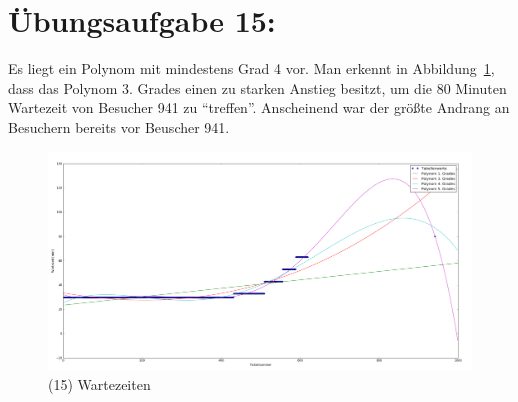 

	\section*{Übungsaufgabe 15:}

	Es liegt ein Polynom mit mindestens Grad 4 vor. Man erkennt in Abbildung~\ref{fig:wartezeiten}, dass das Polynom 3. Grades einen zu starken Anstieg
	besitzt, um die 80 Minuten Wartezeit von Besucher 941 zu ``treffen''. Anscheinend war der größte Andrang an Besuchern bereits vor Beuscher 941.

	\begin{figure}
        \includegraphics[width=1.0\textwidth]{A15.png}
        \caption{(15) Wartezeiten}
        \label{fig:wartezeiten}
    \end{figure}
	
